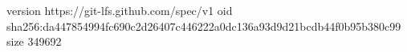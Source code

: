 version https://git-lfs.github.com/spec/v1
oid sha256:da447854994fc690c2d26407c446222a0dc136a93d9d21bcdb44f0b95b380c99
size 349692
